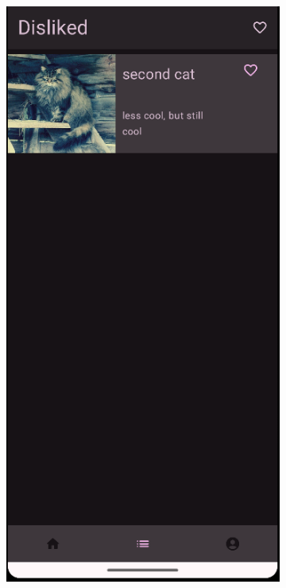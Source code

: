 \documentclass{report}
\begin{document}
\begin{figure}[h]
    \centering
    \begin{subfigure}[b]{0.32\textwidth}
        \includegraphics[width=\textwidth]{DEMO_List2.png} 

\end{subfigure}
\end{figure}
\end{document}
